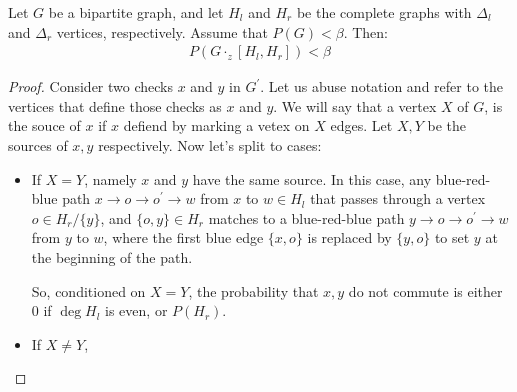 \documentclass[manuscript,screen,review]{acmart}
\begin{document}
\begin{claim}  
Let $G$ be a bipartite graph, and let $H_{l}$ and $H_{r}$ be the complete graphs with $\Delta_{l}$ and $\Delta_{r}$ vertices, respectively. Assume that $P(G) < \beta$. Then:
\begin{equation*}
  \begin{split}
      P(G \cdot_{z} [H_{l},H_{r}]) < \beta
  \end{split}
\end{equation*}
\end{claim}
\begin{proof}
  Consider two checks $x$ and $y$ in $G^{\prime}$. Let us abuse notation and refer to the vertices that define those checks as $x$ and $y$. We will say that a vertex $X$ of $G$, is the souce of $x$ if $x$ defiend by marking a vetex on $X$ edges. Let $X,Y$ be the sources of $x,y$ respectively. Now let's split to cases:
  \begin{itemize}
    \item If $X = Y$, namely $x$ and $y$ have the same source. In this case, any blue-red-blue path $x \rightarrow o \rightarrow o^{\prime} \rightarrow w$ from $x$ to $w \in H_{l}$ that passes through a vertex $o \in H_{r}/\{y\}$, and $\{o,y\} \in H_{r}$ matches to a blue-red-blue path $y \rightarrow o \rightarrow o^{\prime} \rightarrow w$ from $y$ to $w$, where the first blue edge $\{ x, o \}$ is replaced by $\{ y, o \}$ to set $y$ at the beginning of the path.
   
    So, conditioned on $X=Y$, the probability that $x,y$ do not commute is either $0$ if $\deg H_{l}$ is even, or $P(H_{r})$.
  \item If $X\neq Y$, 

  \end{itemize}
\end{proof}
\end{document}
